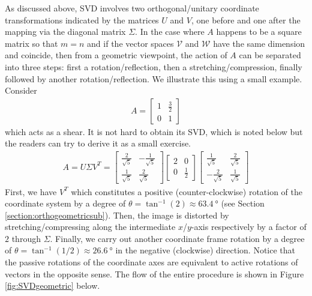 As discussed above, SVD involves two orthogonal/unitary coordinate transformations indicated by the matrices $U$ and $V$, one before and one after the mapping via the diagonal matrix $\Sigma$. In the case where $A$ happens to be a square matrix so that $m=n$ and if the vector spaces $\mathcal{V}$ and $\mathcal{W}$ have the same dimension and coincide, then from a geometric viewpoint, the action of $A$ can be separated into three steps: first a rotation/reflection, then a stretching/compression, finally followed by another rotation/reflection. We illustrate this using a small example. Consider
\begin{align*}
A = \begin{bmatrix}
1 & \frac{3}{2} \\
0 & 1
\end{bmatrix}
\end{align*}
which acts as a shear. It is not hard to obtain its SVD, which is noted below but the readers can try to derive it as a small exercise.
\begin{align*}
A = U \Sigma V^T
=
\begin{bmatrix}
\frac{2}{\sqrt{5}} & -\frac{1}{\sqrt{5}} \\
\frac{1}{\sqrt{5}} & \frac{2}{\sqrt{5}}
\end{bmatrix}
\begin{bmatrix}
2 & 0 \\
0 & \frac{1}{2}
\end{bmatrix}
\begin{bmatrix}
\frac{1}{\sqrt{5}} & \frac{2}{\sqrt{5}} \\
-\frac{2}{\sqrt{5}} & \frac{1}{\sqrt{5}}
\end{bmatrix}
\end{align*}
First, we have $V^T$ which constitutes a positive (counter-clockwise) rotation of the coordinate system by a degree of $\theta = \tan^{-1}(2) \approx \SI{63.4}{\degree}$ (see Section \ref{section:orthogeometricsub}). Then, the image is distorted by stretching/compressing along the intermediate $x$/$y$-axis respectively by a factor of $2$ through $\Sigma$. Finally, we carry out another coordinate frame rotation by a degree of $\theta = \tan^{-1}(1/2) \approx \SI{26.6}{\degree}$ in the negative (clockwise) direction. Notice that the passive rotations of the coordinate axes are equivalent to active rotations of vectors in the opposite sense. The flow of the entire procedure is shown in Figure \ref{fig:SVDgeometric} below.

